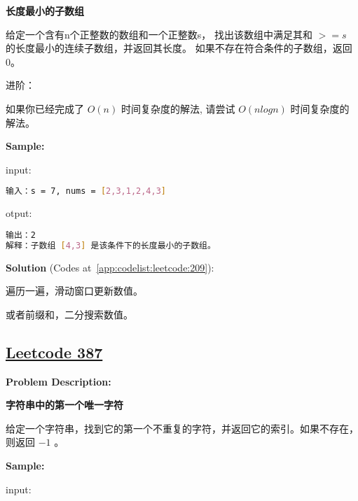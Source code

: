 \textbf{长度最小的子数组}\par

给定一个含有n个正整数的数组和一个正整数s，
找出该数组中满足其和 $ >= s $ 的长度最小的连续子数组，并返回其长度。
如果不存在符合条件的子数组，返回 0。\par

进阶：\par

如果你已经完成了 $ O(n) $ 时间复杂度的解法, 请尝试 $ O(n log n) $ 时间复杂度的解法。\par


\textbf{Sample:}\par

input:\par

\begin{lstlisting}[language=bash]
输入：s = 7, nums = [2,3,1,2,4,3]
\end{lstlisting}

otput:\par

\begin{lstlisting}[language=bash]
输出：2
解释：子数组 [4,3] 是该条件下的长度最小的子数组。
\end{lstlisting}

\textbf{Solution }(Codes at~\ref{app:codelist:leetcode:209}):\par

遍历一遍，滑动窗口更新数值。\par

或者前缀和，二分搜索数值。\par



\subsection{\href{https://leetcode-cn.com/}{Leetcode 387}}\label{app:problemlist:leetcode:387}

\textbf{Problem Description:}\par

\textbf{字符串中的第一个唯一字符}\par

给定一个字符串，找到它的第一个不重复的字符，并返回它的索引。如果不存在，则返回 $ -1 $ 。\par


\textbf{Sample:}\par

input:\par

